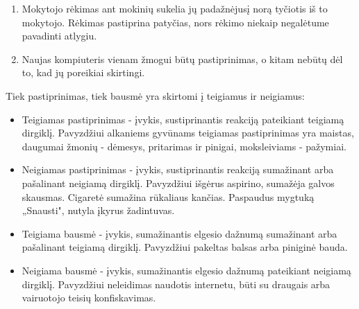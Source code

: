 \documentclass{article}
\begin{document}
\begin{enumerate} 
\item Mokytojo rėkimas ant mokinių sukelia jų padažnėjusį norą tyčiotis iš to mokytojo. Rėkimas pastiprina patyčias, nors rėkimo niekaip negalėtume pavadinti atlygiu. 
\item Naujas kompiuteris vienam žmogui būtų pastiprinimas, o kitam nebūtų dėl to, kad jų poreikiai skirtingi.
\end{enumerate}

Tiek pastiprinimas, tiek bausmė yra skirtomi į teigiamus ir neigiamus:

\begin{itemize}
\item Teigiamas pastiprinimas - įvykis, sustiprinantis reakciją pateikiant teigiamą dirgiklį. Pavyzdžiui alkaniems gyvūnams teigiamas pastiprinimas yra maistas, daugumai žmonių - dėmesys, pritarimas ir pinigai, moksleiviams - pažymiai.
\item Neigiamas pastiprinimas - įvykis, sustiprinantis reakciją sumažinant arba pašalinant neigiamą dirgiklį. Pavyzdžiui išgėrus aspirino, sumažėja galvos skausmas. Cigaretė sumažina rūkaliaus kančias. Paspaudus mygtuką „Snausti", nutyla įkyrus žadintuvas. 
\item Teigiama bausmė - įvykis, sumažinantis elgesio dažnumą sumažinant arba pašalinant teigiamą dirgiklį. Pavyzdžiui pakeltas balsas arba piniginė bauda.
\item Neigiama bausmė - įvykis, sumažinantis elgesio dažnumą pateikiant neigiamą dirgiklį. Pavyzdžiui neleidimas naudotis internetu, būti su draugais arba vairuotojo teisių konfiskavimas.
\end{itemize}
\end{document}
